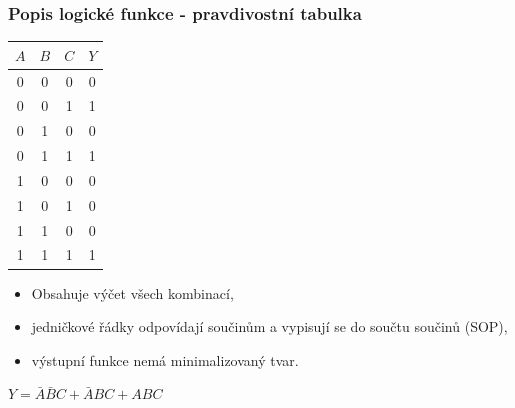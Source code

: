 	\begin{frame}
    \frametitle{Popis logické funkce - pravdivostní tabulka}
		\boldmath
		
		\begin{minipage}[t][\textheight][t]{0.45\textwidth}
		\vspace{10mm}
		\begin{center}
			\begin{tabular}{ c c c | c }
				$A$ & $B$ & $C$ & $Y$\\
				\hline
				0 & 0 & 0 & 0 \\
				0 & 0 & 1 & 1 \\
				0 & 1 & 0 & 0 \\
				0 & 1 & 1 & 1 \\
				1 & 0 & 0 & 0 \\
				1 & 0 & 1 & 0 \\
				1 & 1 & 0 & 0 \\
				1 & 1 & 1 & 1 \\
			\end{tabular}
		\end{center}

		\end{minipage}
		\begin{minipage}[t][\textheight][t]{0.45\textwidth}
    \vspace{10mm}
		
			\begin{itemize}
				\item Obsahuje výčet všech kombinací,
				\item jedničkové řádky odpovídají součinům a vypisují se do součtu součinů (SOP),
				\item výstupní funkce nemá minimalizovaný tvar.
			\end{itemize}
    
		\vspace{5mm}
		$Y= \bar{A}\bar{B}C + \bar{A}BC +ABC$
		\end{minipage}
		
	\end{frame}
	
